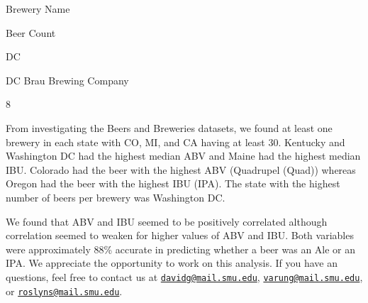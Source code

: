 \documentclass[
]{article}
\begin{document}
Brewery Name

Beer Count

DC

DC Brau Brewing Company

8

From investigating the Beers and Breweries datasets, we found at least
one brewery in each state with CO, MI, and CA having at least 30.
Kentucky and Washington DC had the highest median ABV and Maine had the
highest median IBU. Colorado had the beer with the highest ABV
(Quadrupel (Quad)) whereas Oregon had the beer with the highest IBU
(IPA). The state with the highest number of beers per brewery was
Washington DC.

We found that ABV and IBU seemed to be positively correlated although
correlation seemed to weaken for higher values of ABV and IBU. Both
variables were approximately 88\% accurate in predicting whether a beer
was an Ale or an IPA. We appreciate the opportunity to work on this
analysis. If you have an questions, feel free to contact us at
\href{mailto:davidg@mail.smu.edu}{\nolinkurl{davidg@mail.smu.edu}},
\href{mailto:varung@mail.smu.edu}{\nolinkurl{varung@mail.smu.edu}}, or
\href{mailto:roslyns@mail.smu.edu}{\nolinkurl{roslyns@mail.smu.edu}}.
\end{document}
